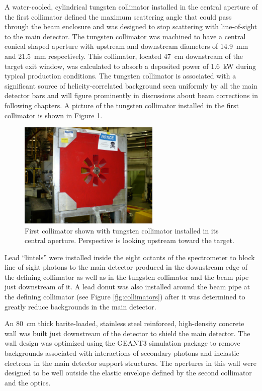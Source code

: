 A water-cooled, cylindrical tungsten collimator installed in the central aperture of the first collimator defined the maximum scattering angle that could pass through the beam enclosure and was designed to stop scattering with line-of-sight to the main detector. The tungsten collimator was machined to have a central conical shaped aperture with upstream and downstream diameters of 14.9~mm and 21.5~mm respectively. This collimator, located 47~cm downstream of the target exit window, was calculated to absorb a deposited power of 1.6~kW during typical production conditions. The tungsten collimator is associated with a significant source of helicity-correlated background seen uniformly by all the main detector bars and will figure prominently in discussions about beam corrections in following chapters. A picture of the tungsten collimator installed in the first collimator is shown in Figure \ref{fig:tungsten_plug}.
\begin{figure}[ht]
\centering
\includegraphics[width=0.6\textwidth]{Pictures/tungsten_plug.JPG}
\caption{First collimator shown with tungsten collimator installed in its central aperture. Perspective is looking upstream toward the target.}
\label{fig:tungsten_plug}
\end{figure} 

Lead ``lintels'' were installed inside the eight octants of the \qtor spectrometer to block line of sight photons to the main detector produced in the downstream edge of the defining collimator as well as in the tungsten collimator and the beam pipe just downstream of it. A lead donut was also installed around the beam pipe at the defining collimator (see Figure \ref{fig:collimators}) after it was determined to greatly reduce backgrounds in the main detector.

An 80~cm thick barite-loaded, stainless steel reinforced, high-density concrete wall was built just downstream of the detector to shield the main detector. The wall design was optimized using the GEANT3 simulation package to remove backgrounds associated with interactions of secondary photons and inelastic electrons in the main detector support structures. The apertures in this wall were designed to be well outside the elastic envelope defined by the second collimator and the \qtor optics.

